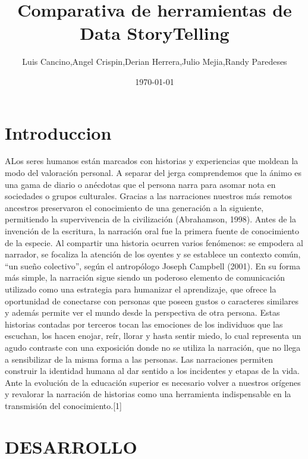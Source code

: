 \documentclass[twoside,twocolumn]{article}
\title{Comparativa de herramientas de Data StoryTelling}
\author{Luis Cancino,Angel Crispin,Derian Herrera,Julio Mejia,Randy Paredeses }
\date{\today}
\begin{document}
\maketitle


\section{Introduccion}
\lettrine[nindent=0em,lines=3]{A}
Los seres humanos están marcados con historias y
experiencias que moldean la modo del valoración 
personal. A separar del jerga comprendemos que la
ánimo es una gama de diario o anécdotas que el 
persona narra para asomar nota en sociedades o 
grupos culturales.
Gracias a las narraciones nuestros más remotos 
ancestros preservaron el conocimiento de una 
generación a la siguiente, permitiendo la 
supervivencia de la civilización (Abrahamson, 1998).
 Antes de la invención de la escritura, la 
narración oral fue la primera fuente de 
conocimiento de la especie. Al compartir una
historia ocurren varios fenómenos: se empodera
al narrador, se focaliza la atención de los 
oyentes y se establece un contexto común, “un
sueño colectivo”, según el antropólogo Joseph
Campbell (2001).
En su forma más simple, la narración sigue siendo 
un poderoso elemento de comunicación utilizado como
una estrategia para humanizar el aprendizaje, que
ofrece la oportunidad de conectarse con personas
que poseen gustos o caracteres similares y además
permite ver el mundo desde la perspectiva de otra
persona. Estas historias contadas por terceros 
tocan las emociones de los individuos que las 
escuchan, los hacen enojar, reír, llorar y
hasta sentir miedo, lo cual representa un 
agudo contraste con una exposición donde no se 
utiliza la narración, que no llega a 
sensibilizar de la misma forma a las personas.
Las narraciones permiten construir la identidad
humana al dar sentido a los incidentes y etapas de 
la vida. Ante la evolución de la educación superior 
es necesario volver a nuestros orígenes y revalorar 
la narración de historias como una herramienta 
indispensable en la transmisión del conocimiento.[1]




\section{DESARROLLO}
\end{document}
